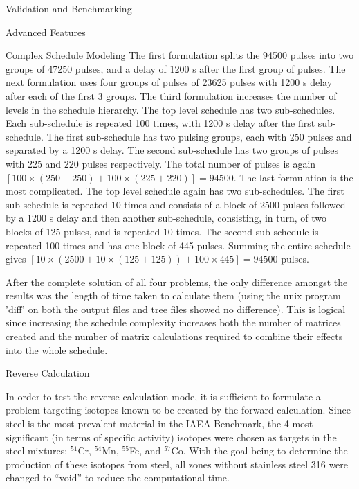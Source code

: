 \begin{chapter}{Validation and Benchmarking\label{chap:valid}}
\begin{section}{Advanced Features}
\begin{subsection}{Complex Schedule Modeling}
      The first formulation splits the 94500 pulses into two groups of
      47250 pulses, and a delay of 1200 s after the first group of
      pulses.  The next formulation uses four groups of pulses of
      23625 pulses with 1200 s delay after each of the first 3 groups.
      The third formulation increases the number of levels in the
      schedule hierarchy.  The top level schedule has two
      sub-schedules.  Each sub-schedule is repeated 100 times, with
      1200 s delay after the first sub-schedule.  The first
      sub-schedule has two pulsing groups, each with 250 pulses and
      separated by a 1200 s delay.  The second sub-schedule has two
      groups of pulses with 225 and 220 pulses respectively.  The
      total number of pulses is again $\left[ 100 \times ( 250 + 250)
        + 100 \times (225 + 220) \right] = 94500$.  The last
      formulation is the most complicated.  The top level schedule
      again has two sub-schedules.  The first sub-schedule is repeated
      10 times and consists of a block of 2500 pulses followed by a
      1200 s delay and then another sub-schedule, consisting, in turn,
      of two blocks of 125 pulses, and is repeated 10 times.  The
      second sub-schedule is repeated 100 times and has one block of
      445 pulses.  Summing the entire schedule gives $\left[ 10 \times
        ( 2500 + 10 \times (125 + 125)) + 100 \times 445\right] =
      94500$ pulses.
    
      After the complete solution of all four problems, the only
      difference amongst the results was the length of time taken to
      calculate them (using the unix program 'diff' on both the output
      files and tree files showed no difference).  This is logical
      since increasing the schedule complexity increases both
      the number of matrices created and the number of matrix
      calculations required to combine their effects into the whole
      schedule.
      
    \end{subsection}
    
    \begin{subsection}{Reverse Calculation}
    
      In order to test the reverse calculation mode, it is sufficient
      to formulate a problem targeting isotopes known to be created by
      the forward calculation.  Since steel is the most prevalent
      material in the IAEA Benchmark, the 4 most significant (in terms
      of specific activity) isotopes were chosen as targets in the
      steel mixtures: $^{51}$Cr, $^{54}$Mn, $^{55}$Fe, and $^{57}$Co.
      With the goal being to determine the production of these
      isotopes from steel, all zones without stainless steel 316 were
      changed to ``void'' to reduce the computational time.
      

\end{subsection}
\end{section}
\end{chapter}
